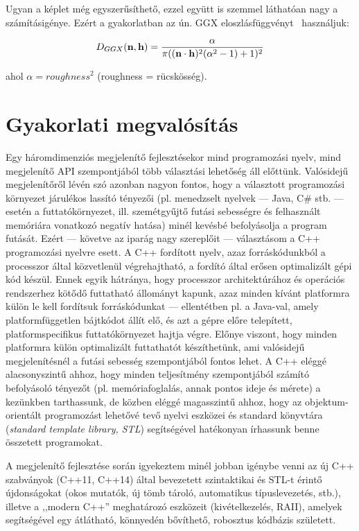 Ugyan a képlet még egyszerűsíthető, ezzel együtt is szemmel láthatóan nagy a számításigénye. Ezért a gyakorlatban az ún. GGX eloszlásfüggvényt~\cite{walter2007microfacet} használjuk:

\[
D_{GGX}(\mathbf{n}, \mathbf{h}) = { \alpha \over { \pi ((\mathbf{n} \cdot \mathbf{h})^2 (\alpha^2 - 1) + 1)^2 } }
\]

\noindent
ahol \(\alpha = {roughness}^2\) (roughness = rücskösség).

\section{Gyakorlati megvalósítás}

Egy háromdimenziós megjelenítő fejlesztésekor mind programozási nyelv, mind megjelenítő API szempontjából több választási lehetőség áll előttünk. Valósidejű megjelenítőről lévén szó azonban nagyon fontos, hogy a választott programozási környezet járulékos lassító tényezői (pl. menedzselt nyelvek --- Java, C\# stb. --- esetén a futtatókörnyezet, ill. szemétgyűjtő futási sebességre és felhasznált memóriára vonatkozó negatív hatása) minél kevésbé befolyásolja a program futását. Ezért --- követve az iparág nagy szereplőit --- választásom a C++ programozási nyelvre esett. A C++ fordított nyelv, azaz forráskódunkból a processzor által közvetlenül végrehajtható, a fordító által erősen optimalizált gépi kód készül. Ennek egyik hátránya, hogy processzor architektúrához és operációs rendszerhez kötődő futtatható állományt kapunk, azaz minden kívánt platformra külön le kell fordítsuk forráskódunkat --- ellentétben pl. a Java-val, amely platformfüggetlen bájtkódot állít elő, és azt a gépre előre telepített, platformspecifikus futtatókörnyezet hajtja végre. Előnye viszont, hogy minden platformra külön optimalizált futtathatót készíthetünk, ami valósidejű megjelenítésnél a futási sebesség szempontjából fontos lehet. A C++ eléggé alacsonyszintű ahhoz, hogy minden teljesítmény szempontjából számító befolyásoló tényezőt (pl. memóriafoglalás, annak pontos ideje és mérete) a kezünkben tarthassunk, de közben eléggé magasszintű ahhoz, hogy az objektum-orientált programozást lehetővé tevő nyelvi eszközei és standard könyvtára (\textit{standard template library, STL}) segítségével hatékonyan írhassunk benne összetett programokat.

A megjelenítő fejlesztése során igyekeztem minél jobban igénybe venni az új C++ szabványok (C++11, C++14) által bevezetett szintaktikai és STL-t érintő újdonságokat (okos mutatók, új tömb tároló, automatikus típuslevezetés, stb.), illetve a ,,modern C++'' meghatározó eszközeit (kivételkezelés, RAII), amelyek segítségével egy átlátható, könnyedén bővíthető, robosztus kódbázis született.

